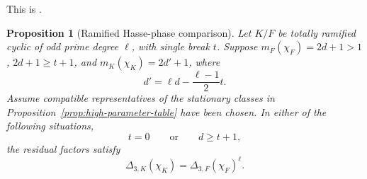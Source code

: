 \documentclass[11pt]{amsart}
\newtheorem{proposition}[theorem]{Proposition}
\theoremstyle{definition}
\theoremstyle{remark}
\begin{document}
This is \cite[Lemma 9.1, pp.~81--84]{Langlands}.




\begin{proposition}[Ramified Hasse-phase comparison]
\label{thm:ramified-Hasse-comparison}
Let $K/F$ be totally ramified cyclic of odd prime degree $\ell$, with
single break $t$.  Suppose
$m_F(\chi_F)=2d+1>1$, $2d+1\ge t+1$, and
$m_K(\chi_K)=2d'+1$, where
\[
 d'=\ell d-\frac{\ell-1}{2}t.
\]
Assume compatible representatives of the stationary classes in
Proposition~\ref{prop:high-parameter-table} have been chosen.  In either
of the following situations,
\[
 t=0\qquad\text{or}\qquad d\ge t+1,
\]
the residual factors satisfy
\begin{equation}\label{eq:ramified-Hasse-comparison}
 \Delta_{3,K}(\chi_K)=\Delta_{3,F}(\chi_F)^\ell.
\end{equation}
\end{proposition}
\end{document}
